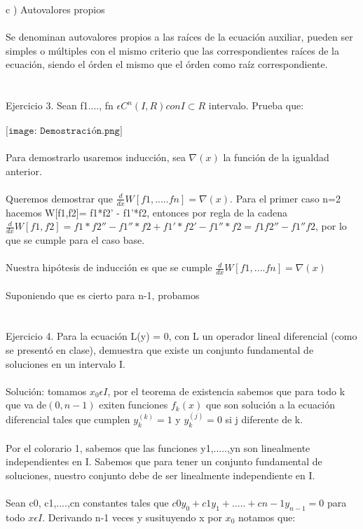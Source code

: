 \documentclass[a4paper,10pt]{article}
\begin{document}
c ) Autovalores propios\\\\
Se denominan autovalores propios a las raíces de la ecuación auxiliar, pueden ser simples o múltiples con el mismo criterio que las correspondientes raíces de la ecuación, siendo el órden el mismo que el órden como raíz correspondiente.\\\\\\
Ejercicio 3. Sean f1...., fn $\epsilon C^n (I,R) con I \subset R$ intervalo. Prueba que:\\\\
$\texttt{[image: Demostración.png]}$\\\\
Para demostrarlo usaremos inducción, sea $\nabla(x)$ la función de la igualdad anterior.\\\\
Queremos demostrar que $\frac{d}{dx} W[f1,.....fn]= \nabla(x)$. Para el primer caso n=2 hacemos W[f1,f2]= f1*f2' - f1'*f2, entonces por regla de la cadena $\frac{d}{dx} W[f1,f2] =   f1*f2'' - f1''*f2 +  f1'*f2' - f1''*f2 = f1f2'' - f1''f2$, por lo que se cumple para el caso base.\\\\
Nuestra hipótesis de inducción es que se cumple $\frac{d}{dx} W[f1,....fn]= \nabla(x)$\\\\
Suponiendo que es cierto para n-1, probamos 
\\\\\\
Ejercicio 4. Para la ecuación L(y) = 0, con L un operador lineal diferencial (como se presentó en clase), demuestra que existe un conjunto fundamental de soluciones en un intervalo I.\\\\
Solución: tomamos $x_0 \epsilon I$, por el teorema de existencia sabemos que para todo k que va de$(0,n-1)$ exiten funciones $f_k (x)$ que son solución a la ecuación diferencial tales que cumplen $y_k ^{(k)} = 1 $ y $y_k ^{(j)} = 0$ si j diferente de k.\\\\
Por el colorario 1, sabemos que las funciones y1,.....,yn son linealmente independientes en I. Sabemos que para tener un conjunto fundamental de soluciones, nuestro conjunto debe de ser linealmente independiente en I.\\\\
Sean c0, c1,....,cn constantes tales que $c0 y_0 + c1y_1 +.....+cn-1 y_{n-1} = 0$ para todo $x\epsilon I$. Derivando n-1 veces y susituyendo x por $x_0$ notamos que:\\\\
\end{document}
